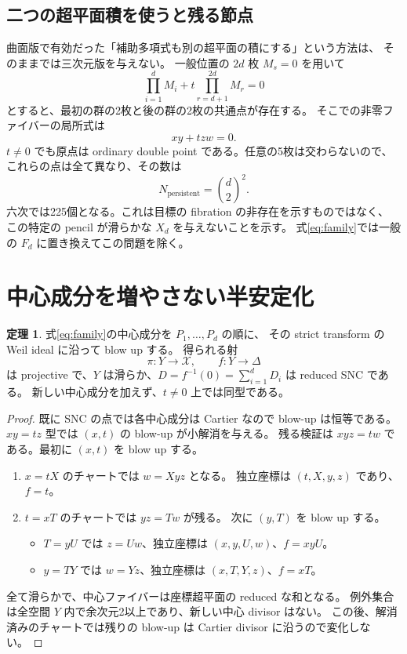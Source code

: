 \documentclass[11pt,a4paper]{article}
\theoremstyle{definition}
\newtheorem{theorem}{定理}[section]
\newcommand{\cX}{\mathcal X}
\begin{document}
\subsection{二つの超平面積を使うと残る節点}

曲面版で有効だった「補助多項式も別の超平面の積にする」という方法は、
そのままでは三次元版を与えない。
一般位置の $2d$ 枚 $M_s=0$ を用いて
\[
\prod_{i=1}^{d}M_i+t\prod_{r=d+1}^{2d}M_r=0
\]
とすると、最初の群の2枚と後の群の2枚の共通点が存在する。
そこでの非零ファイバーの局所式は
\[
xy+tzw=0.
\]
$t\ne0$ でも原点は ordinary double point である。任意の5枚は交わらないので、
これらの点は全て異なり、その数は
\begin{equation}\label{eq:persistent}
N_{\mathrm{persistent}}=\binom d2^2.
\end{equation}
六次では225個となる。これは目標の fibration の非存在を示すものではなく、
この特定の pencil が滑らかな $X_d$ を与えないことを示す。
式\eqref{eq:family}では一般の $F_d$ に置き換えてこの問題を除く。

\section{中心成分を増やさない半安定化}\label{sec:resolution}

\begin{theorem}\label{thm:snc}
式\eqref{eq:family}の中心成分を $P_1,\ldots,P_d$ の順に、
その strict transform の Weil ideal に沿って blow up する。
得られる射
\[
\pi:Y\longrightarrow\cX,\qquad f:Y\longrightarrow\Delta
\]
は projective で、$Y$ は滑らか、$D=f^{-1}(0)=\sum_{i=1}^dD_i$ は reduced SNC である。
新しい中心成分を加えず、$t\ne0$ 上では同型である。
\end{theorem}

\begin{proof}
既に SNC の点では各中心成分は Cartier なので blow-up は恒等である。
$xy=tz$ 型では $(x,t)$ の blow-up が小解消を与える。
残る検証は $xyz=tw$ である。最初に $(x,t)$ を blow up する。
\begin{enumerate}
\item $x=tX$ のチャートでは $w=Xyz$ となる。
独立座標は $(t,X,y,z)$ であり、$f=t$。
\item $t=xT$ のチャートでは $yz=Tw$ が残る。
次に $(y,T)$ を blow up する。
\begin{itemize}
\item $T=yU$ では $z=Uw$、独立座標は $(x,y,U,w)$、$f=xyU$。
\item $y=TY$ では $w=Yz$、独立座標は $(x,T,Y,z)$、$f=xT$。
\end{itemize}
\end{enumerate}
全て滑らかで、中心ファイバーは座標超平面の reduced な和となる。
例外集合は全空間 $Y$ 内で余次元2以上であり、新しい中心 divisor はない。
この後、解消済みのチャートでは残りの blow-up は Cartier divisor に沿うので変化しない。
\end{proof}
\end{document}
